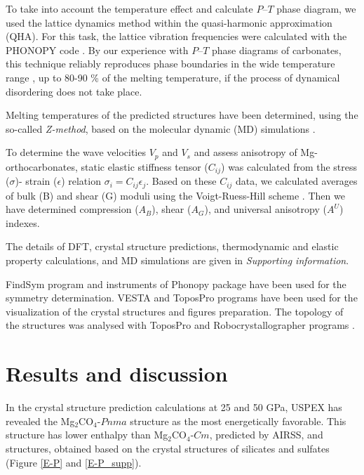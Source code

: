 \documentclass[a4paperm]{article}
\begin{document}
To take into account the temperature effect and calculate $P$--$T$ phase diagram, we used the lattice dynamics method within the quasi-harmonic approximation (QHA).
For this task, the lattice vibration frequencies were calculated with the PHONOPY code \cite{phonopy}.
By our experience with $P$--$T$ phase diagrams of carbonates, this technique reliably reproduces phase boundaries in the wide temperature range \cite{gavr2019_alk, gavr2020_disarag, sagatova2020_ortho}, up to 80-90 \% of the melting temperature, if the process of dynamical disordering does not take place.

Melting temperatures of the predicted structures have been determined, using the so-called {\it Z-method}, based on the molecular dynamic (MD) simulations \cite{z-method}.

To determine the wave velocities $V_p$ and $V_s$ and assess anisotropy of Mg-orthocarbonates, static elastic stiffness tensor ($C_{ij}$) was calculated from the stress ($\sigma$)- strain ($\epsilon$) relation $\sigma_i=C_{ij}\epsilon_j$.
Based on these $C_{ij}$ data, we calculated averages of bulk (B) and shear (G) moduli using the Voigt-Ruess-Hill scheme \cite{hill1952,hill1963}.
 Then we have determined compression ($A_B$), shear ($A_G$), and universal anisotropy ($A^U$) indexes.

The details of DFT, crystal structure predictions, thermodynamic and elastic property calculations, and MD simulations are given in {\it Supporting information}.

FindSym program \cite{stokes2005} and instruments of Phonopy package have been used for the symmetry determination.
VESTA and ToposPro \cite{vesta,topos} programs have been used for the visualization of the crystal structures and figures preparation.
The topology of the structures was analysed with ToposPro and Robocrystallographer programs \cite{topos,robocrys}.



			\section{Results and discussion}
 
In the crystal structure prediction calculations at 25 and 50 GPa, USPEX has revealed the Mg$_2$CO$_4$-$Pnma$ structure as the most energetically favorable.
This structure has lower enthalpy than Mg$_2$CO$_4$-$Cm$, predicted by AIRSS, and structures, obtained based on the crystal structures of silicates and sulfates (Figure \ref{E-P} and \ref{E-P_supp}).
\end{document}
